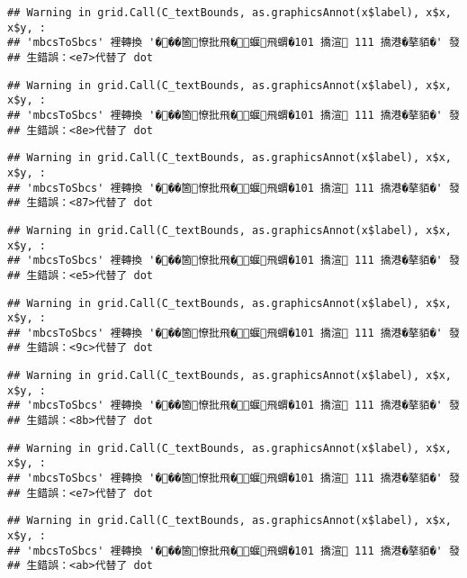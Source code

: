 \documentclass[
]{article}
\begin{document}
\begin{verbatim}
## Warning in grid.Call(C_textBounds, as.graphicsAnnot(x$label), x$x, x$y, :
## 'mbcsToSbcs' 裡轉換 '���箇憭批飛�蝘飛蝟�101 撟渲 111 撟港�摮貊�' 發
## 生錯誤：<e7>代替了 dot
\end{verbatim}

\begin{verbatim}
## Warning in grid.Call(C_textBounds, as.graphicsAnnot(x$label), x$x, x$y, :
## 'mbcsToSbcs' 裡轉換 '���箇憭批飛�蝘飛蝟�101 撟渲 111 撟港�摮貊�' 發
## 生錯誤：<8e>代替了 dot
\end{verbatim}

\begin{verbatim}
## Warning in grid.Call(C_textBounds, as.graphicsAnnot(x$label), x$x, x$y, :
## 'mbcsToSbcs' 裡轉換 '���箇憭批飛�蝘飛蝟�101 撟渲 111 撟港�摮貊�' 發
## 生錯誤：<87>代替了 dot
\end{verbatim}

\begin{verbatim}
## Warning in grid.Call(C_textBounds, as.graphicsAnnot(x$label), x$x, x$y, :
## 'mbcsToSbcs' 裡轉換 '���箇憭批飛�蝘飛蝟�101 撟渲 111 撟港�摮貊�' 發
## 生錯誤：<e5>代替了 dot
\end{verbatim}

\begin{verbatim}
## Warning in grid.Call(C_textBounds, as.graphicsAnnot(x$label), x$x, x$y, :
## 'mbcsToSbcs' 裡轉換 '���箇憭批飛�蝘飛蝟�101 撟渲 111 撟港�摮貊�' 發
## 生錯誤：<9c>代替了 dot
\end{verbatim}

\begin{verbatim}
## Warning in grid.Call(C_textBounds, as.graphicsAnnot(x$label), x$x, x$y, :
## 'mbcsToSbcs' 裡轉換 '���箇憭批飛�蝘飛蝟�101 撟渲 111 撟港�摮貊�' 發
## 生錯誤：<8b>代替了 dot
\end{verbatim}

\begin{verbatim}
## Warning in grid.Call(C_textBounds, as.graphicsAnnot(x$label), x$x, x$y, :
## 'mbcsToSbcs' 裡轉換 '���箇憭批飛�蝘飛蝟�101 撟渲 111 撟港�摮貊�' 發
## 生錯誤：<e7>代替了 dot
\end{verbatim}

\begin{verbatim}
## Warning in grid.Call(C_textBounds, as.graphicsAnnot(x$label), x$x, x$y, :
## 'mbcsToSbcs' 裡轉換 '���箇憭批飛�蝘飛蝟�101 撟渲 111 撟港�摮貊�' 發
## 生錯誤：<ab>代替了 dot
\end{verbatim}
\end{document}
